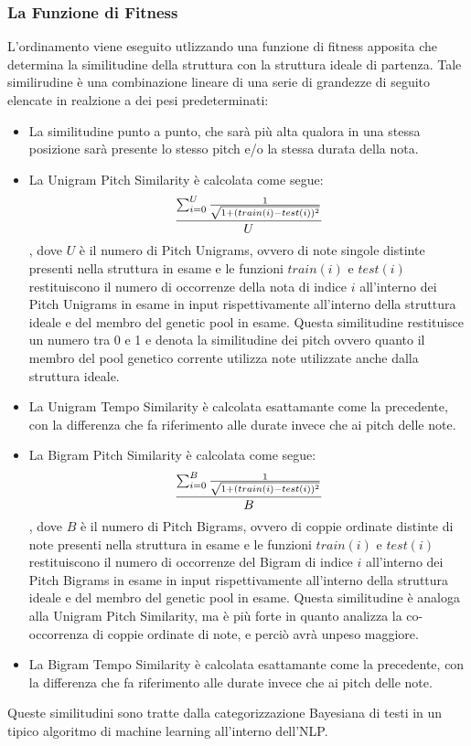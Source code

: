  \subsubsection{La Funzione di Fitness}
 L'ordinamento viene eseguito utlizzando una funzione di fitness apposita che determina la similitudine della struttura con la struttura ideale di partenza.
 Tale similirudine è una combinazione lineare di una serie di grandezze di seguito elencate in realzione a dei pesi predeterminati:
 \begin{itemize}
  \item La similitudine punto a punto, che sarà più alta qualora in una stessa posizione sarà presente lo stesso pitch e/o la stessa durata della nota.
  \item La Unigram Pitch Similarity è calcolata come segue:
  $${\sum_{i=0}^{U}{1 \over \sqrt{1 + (train(i)-test(i))^{2}}} \over U}$$, dove $U$ è il numero di Pitch Unigrams, ovvero di note singole distinte presenti nella struttura in esame e le funzioni $train(i)$ e $test(i)$ restituiscono il numero di occorrenze della nota di indice $i$ all'interno dei Pitch Unigrams in esame in input rispettivamente all'interno della struttura ideale e del membro del genetic pool in esame.
  Questa similitudine restituisce un numero tra 0 e 1 e denota la similitudine dei pitch ovvero quanto il membro del pool genetico corrente utilizza note utilizzate anche dalla struttura ideale.
  \item La Unigram Tempo Similarity è calcolata esattamante come la precedente, con la differenza che fa riferimento alle durate invece che ai pitch delle note.
  \item La Bigram Pitch Similarity è calcolata come segue:
   $${\sum_{i=0}^{B}{1 \over \sqrt{1 + (train(i)-test(i))^{2}}} \over B}$$, dove $B$ è il numero di Pitch Bigrams, ovvero di coppie ordinate distinte di note presenti nella struttura in esame e le funzioni $train(i)$ e $test(i)$ restituiscono il numero di occorrenze del Bigram di indice $i$ all'interno dei Pitch Bigrams in esame in input rispettivamente all'interno della struttura ideale e del membro del genetic pool in esame.
   Questa similitudine è analoga alla Unigram Pitch Similarity, ma è più forte in quanto analizza la co-occorrenza di coppie ordinate di note, e perciò avrà unpeso maggiore.
   \item La Bigram Tempo Similarity è calcolata esattamante come la precedente, con la differenza che fa riferimento alle durate invece che ai pitch delle note.
 \end{itemize}
Queste similitudini sono tratte dalla categorizzazione Bayesiana di testi in un tipico algoritmo di machine learning all'interno dell'NLP.

